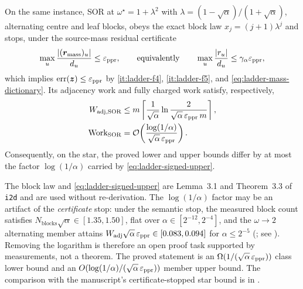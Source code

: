 \begin{theorem}
\label{thm:ladder-signed-upper-bound}
On the same instance, SOR at $\omega^{\star}=1+\lambda^{2}$ with
$\lambda=(1-\sqrt\alpha)/(1+\sqrt\alpha)$, alternating centre and leaf blocks,
obeys the exact block law $x_{j}=(j+1)\lambda^{j}$ and stops, under the
source-mass residual certificate
\begin{equation}
    \max_u\frac{\left\lvert (\bm{r}_{\mathrm{mass}})_u \right\rvert}{d_u}\le\varepsilon_{\mathrm{ppr}},
    \qquad\text{equivalently}\qquad
    \max_u\frac{\left\lvert r_u \right\rvert}{d_u}\le\gamma_{\alpha}\varepsilon_{\mathrm{ppr}},
    \label{eq:ladder-sor-certificate-scales}
\end{equation}
which implies $\operatorname{err}(\bm{z})\le\varepsilon_{\mathrm{ppr}}$ by
\ref{it:ladder-f4}, \ref{it:ladder-f5}, and
\eqref{eq:ladder-mass-dictionary}. Its adjacency work and fully charged work
satisfy, respectively,
\begin{equation}
\begin{aligned}
    W_{\mathrm{adj,SOR}}
    &\le m\left\lceil \frac{1}{\sqrt\alpha}
        \ln\frac{2}{\sqrt\alpha\,\varepsilon_{\mathrm{ppr}}\,m} \right\rceil,\\
    \operatorname{Work}_{\mathrm{SOR}}
    &=\mathcal{O}\!\left(\frac{\log(1/\alpha)}
        {\sqrt\alpha\,\varepsilon_{\mathrm{ppr}}}\right).
\end{aligned}
    \label{eq:ladder-signed-upper}
\end{equation}
Consequently, on the star, the proved lower and upper bounds differ by at most
the factor $\log(1/\alpha)$ carried by \eqref{eq:ladder-signed-upper}.
\end{theorem}

\noindent
The block law and \eqref{eq:ladder-signed-upper} are Lemma~3.1 and
Theorem~3.3 of \texttt{i2d} and are used without re-derivation. The
$\log(1/\alpha)$ factor may be an artifact of the \emph{certificate} stop:
under the semantic stop, the measured block count satisfies
$N_{\mathrm{blocks}}\sqrt\alpha\in[1.35,1.50]$, flat over
$\alpha\in[2^{-12},2^{-4}]$, and the $\omega\to2$ alternating member attains
$W_{\mathrm{adj}}\sqrt\alpha\,\varepsilon_{\mathrm{ppr}}\in[0.083,0.094]$ for
$\alpha\le2^{-5}$ (\statusmeasured; see
). Removing the logarithm is therefore an open
proof task supported by measurements, not a theorem. The proved statement is
an $\Omega(1/(\sqrt\alpha\,\varepsilon_{\mathrm{ppr}}))$ class lower bound and an
$O(\log(1/\alpha)/(\sqrt\alpha\,\varepsilon_{\mathrm{ppr}}))$ member upper bound. The comparison with the
manuscript's certificate-stopped star bound is in
.

